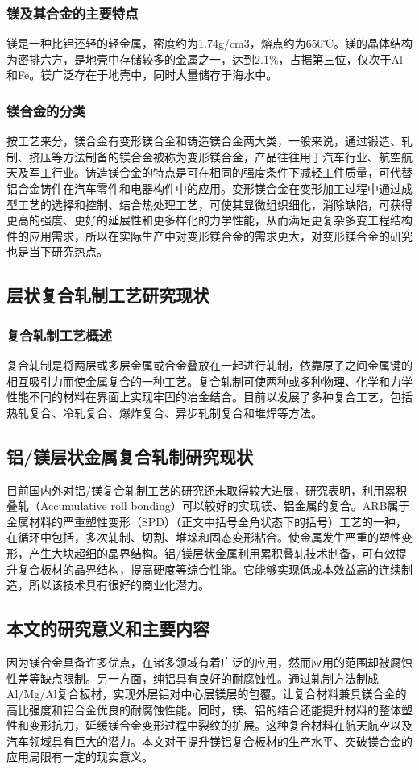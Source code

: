 \subsubsection{镁及其合金的主要特点}
镁是一种比铝还轻的轻金属，密度约为1.74g/cm3，熔点约为650℃。镁的晶体结构为密排六方，是地壳中存储较多的金属之一，达到2.1\%，占据第三位，仅次于Al和Fe。镁广泛存在于地壳中，同时大量储存于海水中。\par
\subsubsection{镁合金的分类}
按工艺来分，镁合金有变形镁合金和铸造镁合金两大类，一般来说，通过锻造、轧制、挤压等方法制备的镁合金被称为变形镁合金，产品往往用于汽车行业、航空航天及军工行业。铸造镁合金的特点是可在相同的强度条件下减轻工件质量，可代替铝合金铸件在汽车零件和电器构件中的应用。变形镁合金在变形加工过程中通过成型工艺的选择和控制、结合热处理工艺，可使其显微组织细化，消除缺陷，可获得更高的强度、更好的延展性和更多样化的力学性能，从而满足更复杂多变工程结构件的应用需求，所以在实际生产中对变形镁合金的需求更大，对变形镁合金的研究也是当下研究热点。\par
\subsection{层状复合轧制工艺研究现状}
\subsubsection{复合轧制工艺概述}
复合轧制是将两层或多层金属或合金叠放在一起进行轧制，依靠原子之间金属键的相互吸引力而使金属复合的一种工艺。复合轧制可使两种或多种物理、化学和力学性能不同的材料在界面上实现牢固的冶金结合。目前以发展了多种复合工艺，包括热轧复合、冷轧复合、爆炸复合、异步轧制复合和堆焊等方法。\par
\subsection{铝/镁层状金属复合轧制研究现状}
目前国内外对铝/镁复合轧制工艺的研究还未取得较大进展，研究表明，利用累积叠轧（Accumulative roll bonding）可以较好的实现镁、铝金属的复合。ARB属于金属材料的严重塑性变形（SPD）（正文中括号全角状态下的括号）工艺的一种，在循环中包括，多次轧制、切割、堆垛和固态变形粘合。使金属发生严重的塑性变形，产生大块超细的晶界结构。铝/镁层状金属利用累积叠轧技术制备，可有效提升复合板材的晶界结构，提高硬度等综合性能。它能够实现低成本效益高的连续制造，所以该技术具有很好的商业化潜力。\par
\subsection{本文的研究意义和主要内容}
因为镁合金具备许多优点，在诸多领域有着广泛的应用，然而应用的范围却被腐蚀性差等缺点限制。另一方面，纯铝具有良好的耐腐蚀性。通过轧制方法制成Al/Mg/Al复合板材，实现外层铝对中心层镁层的包覆。让复合材料兼具镁合金的高比强度和铝合金优良的耐腐蚀性能。同时，镁、铝的结合还能提升材料的整体塑性和变形抗力，延缓镁合金变形过程中裂纹的扩展。这种复合材料在航天航空以及汽车领域具有巨大的潜力。本文对于提升镁铝复合板材的生产水平、突破镁合金的应用局限有一定的现实意义。\par

\clearpage